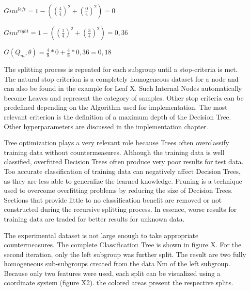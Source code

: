 \(Gini^{left}  = 1 - ((\frac{4}{4})^2 + (\frac{0}{4})^2) = 0 \)

\(Gini^{right} = 1 - ((\frac{1}{4})^2 + (\frac{3}{4})^2) = 0,36 \)

\(G(Q_{m},\theta) = \frac{4}{8} * 0 + \frac{4}{8} * 0,36 = 0,18 \)

The splitting process is repeated for each subgroup until a stop-criteria is met. The natural 
stop criterion is a completely homogeneous dataset for a node and can also be found in the 
example for Leaf X. Such Internal Nodes automatically become Leaves and represent the category 
of samples. Other stop criteria can be predefined depending on the Algorithm used for 
implementation. The most relevant criterion is the definition of a maximum depth of the Decision 
Tree. Other hyperparameters are discussed in the implementation chapter. 

Tree optimization plays a very relevant role because Trees often overclassify training data 
without countermeasures. Although the training data is well classified, overfitted Decision 
Trees often produce very poor results for test data. Too accurate classification of training 
data can negatively affect Decision Trees, as they are less able to generalize the learned 
knowledge. Pruning is a technique used to overcome overfitting problems by reducing the size of 
Decision Trees. Sections that provide little to no classification benefit are removed or not 
constructed during the recursive splitting process. In essence, worse results for training data 
are traded for better results for unknown data.

The experimental dataset is not large enough to take appropriate countermeasures. The complete 
Classification Tree is shown in figure X. For the second iteration, only the left subgroup was 
further split. The result are two fully homogeneous sub-subgroups created from the data Nm of the 
left subgroup. Because only two features were used, each split can be visualized using a 
coordinate system (figure X2). the colored areas present the respective splits.